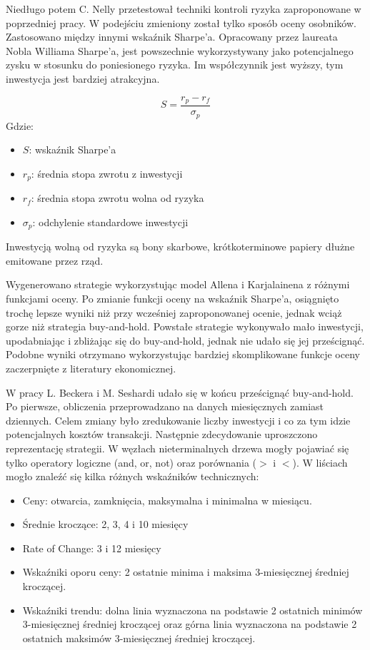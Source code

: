 \documentclass[twoside]{iisthesis}
\begin{document}
Niedługo potem C. Nelly \cite{Neely200369} przetestował techniki kontroli ryzyka zaproponowane w poprzedniej pracy. W podejściu zmieniony został tylko sposób oceny osobników. Zastosowano między innymi wskaźnik Sharpe'a. Opracowany przez laureata Nobla Williama Sharpe'a, jest powszechnie wykorzystywany jako potencjalnego zysku w stosunku do poniesionego ryzyka. Im współczynnik jest wyższy, tym inwestycja jest bardziej atrakcyjna.

\[S=\frac{r_{p} - r_{f}}{\sigma_{p}}\]
Gdzie:
\begin{itemize}[label=]
	\item $S$: wskaźnik Sharpe'a
	\item $r_p$: średnia stopa zwrotu z inwestycji
	\item $r_f$: średnia stopa zwrotu wolna od ryzyka
	\item $\sigma_p$: odchylenie standardowe inwestycji
\end{itemize}

Inwestycją wolną od ryzyka są bony skarbowe, krótkoterminowe papiery dłużne emitowane przez rząd.

Wygenerowano strategie wykorzystując model Allena i Karjalainena z różnymi funkcjami oceny. Po zmianie funkcji oceny na wskaźnik Sharpe'a, osiągnięto trochę lepsze wyniki niż przy wcześniej zaproponowanej ocenie, jednak wciąż gorze niż strategia buy-and-hold. Powstałe strategie wykonywało mało inwestycji, upodabniając i zbliżając się do buy-and-hold, jednak nie udało się jej prześcignąć. Podobne wyniki otrzymano wykorzystując bardziej skomplikowane funkcje oceny zaczerpnięte z literatury ekonomicznej.

W pracy L. Beckera i M. Seshardi \cite{Becker:2003} udało się w końcu prześcignąć buy-and-hold. Po pierwsze, obliczenia przeprowadzano na danych miesięcznych zamiast dziennych. Celem zmiany było zredukowanie liczby inwestycji i co za tym idzie potencjalnych kosztów transakcji. Następnie zdecydowanie uproszczono reprezentację strategii. W węzłach nieterminalnych drzewa mogły pojawiać się tylko operatory logiczne (and, or, not) oraz porównania ($>$ i $<$).  W liściach mogło znaleźć się kilka różnych wskaźników technicznych:

\begin{itemize}
	\item Ceny: otwarcia, zamknięcia, maksymalna i minimalna w miesiącu.
	\item Średnie kroczące: 2, 3, 4 i 10 miesięcy
	\item Rate of Change: 3 i 12 miesięcy
	\item Wskaźniki oporu ceny: 2 ostatnie minima i maksima 3-miesięcznej średniej kroczącej.
	\item Wskaźniki trendu: dolna linia wyznaczona na podstawie 2 ostatnich minimów 3-miesięcznej średniej kroczącej oraz górna linia wyznaczona na podstawie 2 ostatnich maksimów 3-miesięcznej średniej kroczącej.
\end{itemize}
\end{document}
